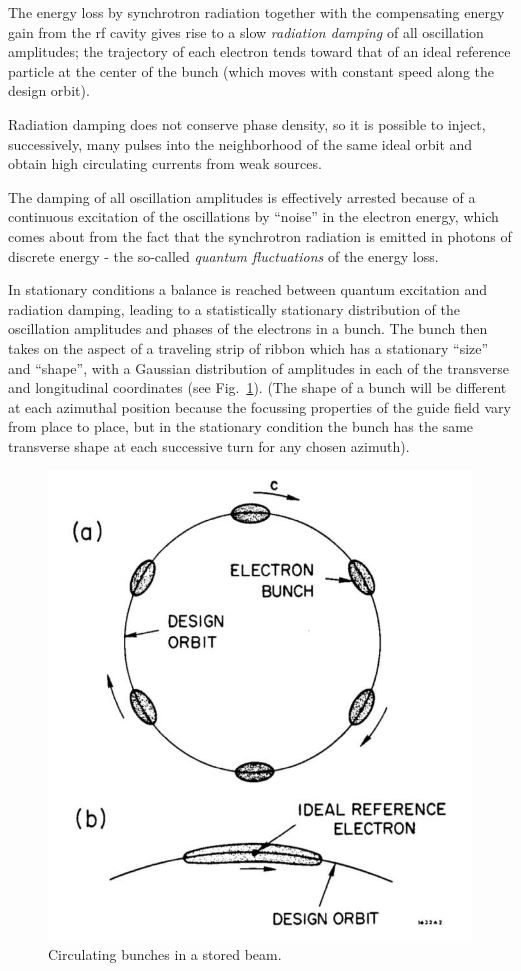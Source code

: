 The energy loss by synchrotron radiation together with the compensating energy gain from the rf cavity gives rise to a slow \emph{radiation damping} of all oscillation amplitudes; the trajectory of each electron tends toward that of an ideal reference particle at the center of the bunch (which moves with constant speed along the design orbit).

Radiation damping does not conserve phase density, so it is possible to inject, successively, many pulses into the neighborhood of the same ideal orbit and obtain high circulating currents from weak sources.

The damping of all oscillation amplitudes is effectively arrested because of a continuous excitation of the oscillations by “noise” in the electron energy, which comes about from the fact that the synchrotron radiation is emitted in photons of discrete energy - the so-called \emph{quantum fluctuations} of the energy loss.

In stationary conditions a balance is reached between quantum excitation and radiation damping, leading to a statistically stationary distribution of the oscillation amplitudes and phases of the electrons in a bunch. The bunch then takes on the aspect of a traveling strip of ribbon which has a stationary “size” and “shape”, with a Gaussian distribution of amplitudes in each of the transverse and longitudinal coordinates (see Fig.~\ref{fig:fig2}). (The shape of a bunch will be different at each azimuthal position because the focussing properties of the guide field vary from place to place, but in the stationary condition the bunch has the same transverse shape at each successive turn for any chosen azimuth).

\begin{figure}[!htb]
	\centering
	\includegraphics[width=0.55\linewidth]{./Figuras/fig02.jpeg}
	\caption{Circulating bunches in a stored beam.}
	\label{fig:fig2}
\end{figure}

